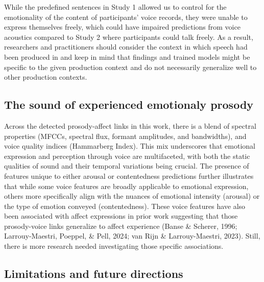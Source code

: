 \documentclass[
  english,
  man,floatsintext]{apa6}
\begin{document}
While the predefined sentences in Study 1 allowed us to control for the emotionality of the content of participants' voice records, they were unable to express themselves freely, which could have impaired predictions from voice acoustics compared to Study 2 where participants could talk freely. As a result, researchers and practitioners should consider the context in which speech had been produced in and keep in mind that findings and trained models might be specific to the given production context and do not necessarily generalize well to other production contexts.

\hypertarget{the-sound-of-experienced-emotionaly-prosody}{%
\subsection{The sound of experienced emotionaly prosody}\label{the-sound-of-experienced-emotionaly-prosody}}

Across the detected prosody-affect links in this work, there is a blend of spectral properties (MFCCs, spectral flux, formant amplitudes, and bandwidths), and voice quality indices (Hammarberg Index). This mix underscores that emotional expression and perception through voice are multifaceted, with both the static qualities of sound and their temporal variations being crucial. The presence of features unique to either arousal or contentedness predictions further illustrates that while some voice features are broadly applicable to emotional expression, others more specifically align with the nuances of emotional intensity (arousal) or the type of emotion conveyed (contentedness). These voice features have also been associated with affect expressions in prior work suggesting that those prosody-voice links generalize to affect experience (Banse \& Scherer, 1996; Larrouy-Maestri, Poeppel, \& Pell, 2024; van Rijn \& Larrouy-Maestri, 2023). Still, there is more research needed investigating those specific associations.

\hypertarget{limitations-and-future-directions}{%
\subsection{Limitations and future directions}\label{limitations-and-future-directions}}
\end{document}

